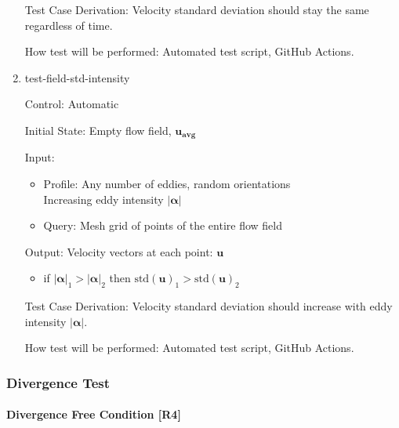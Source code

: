 \documentclass[12pt, titlepage]{article}
\begin{document}
\begin{enumerate}
  Test Case Derivation: Velocity standard deviation should stay the same regardless of time.

  How test will be performed: Automated test script, GitHub Actions.

  \item{test-field-std-intensity\\}

  Control: Automatic
            
  Initial State: Empty flow field, $\mathbf{u_{avg}}$
            
  Input:
  \begin{itemize}
    \item Profile: Any number of eddies, random orientations\\
    Increasing eddy intensity $|\mathbf{\alpha}|$
    \item Query: Mesh grid of points of the entire flow field
  \end{itemize}
  Output: Velocity vectors at each point: $\mathbf{u}$
  \begin{itemize}
    \item if $|\mathbf{\alpha}|_1 > |\mathbf{\alpha}|_2$ then $\text{std}(\mathbf{u})_1 > \text{std}(\mathbf{u})_2$
  \end{itemize}

  Test Case Derivation: Velocity standard deviation should increase with eddy intensity $|\mathbf{\alpha}|$.

  How test will be performed: Automated test script, GitHub Actions.

\end{enumerate}

\subsubsection{Divergence Test} \label{DivergenceFree}
\paragraph{Divergence Free Condition [R4]} 
\end{document}
